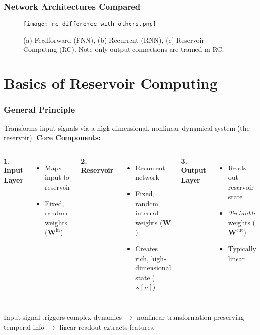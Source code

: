 \documentclass{beamer}
\begin{document}
\begin{frame}
  \frametitle{Network Architectures Compared}
    \begin{figure}
        \centering
        \texttt{[image: rc\_difference\_with\_others.png]}
        \caption{ (a) Feedforward (FNN), (b) Recurrent (RNN), (c) Reservoir Computing (RC). Note only output connections are trained in RC. \cite{article_RC_intro}}
        \label{fig:rc_diff_slide}
    \end{figure}
\end{frame}

\section{Basics of Reservoir Computing}

\begin{frame}
  \frametitle{General Principle}
  Transforms input signals via a high-dimensional, nonlinear dynamical system (the reservoir).
  \vspace{1em}
  \textbf{Core Components:}
  \begin{columns}[T] %
      \textbf{1. Input Layer}
      \begin{itemize}
        \item Maps input to reservoir
        \item Fixed, random weights ($\mathbf{W}^{\mathrm{in}}$)
      \end{itemize}
      \textbf{2. Reservoir}
      \begin{itemize}
        \item Recurrent network
        \item Fixed, random internal weights ($\mathbf{W}$)
        \item Creates rich, high-dimensional state ($\mathbf{x}[n]$)
      \end{itemize}
      \textbf{3. Output Layer}
      \begin{itemize}
        \item Reads out reservoir state
        \item \textit{Trainable} weights ($\mathbf{W}^{\mathrm{out}}$)
        \item Typically linear
      \end{itemize}
  \end{columns}
  \vspace{1em}
  \pause
  Input signal triggers complex dynamics $\rightarrow$ nonlinear transformation preserving temporal info $\rightarrow$ linear readout extracts features.
\end{frame}
\end{document}
